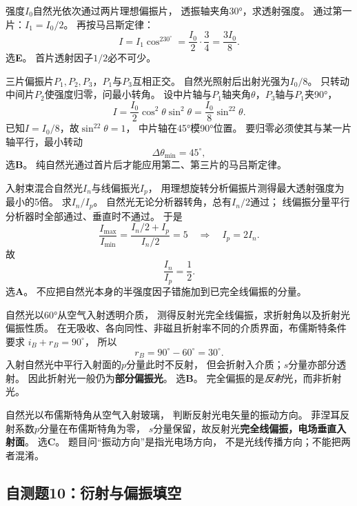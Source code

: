 \problemtext 强度$I_0$自然光依次通过两片理想偏振片，
透振轴夹角30°，求透射强度。
\workings
通过第一片：$I_1=I_0/2$。
再按马吕斯定律：
\[
\boxed{I=I_1\cos^230^\circ
=\frac{I_0}{2}\cdot\frac34=\frac{3I_0}{8}}.
\]
选\textbf{E}。
\crosscheck 首片透射因子$1/2$必不可少。

\problemtext 三片偏振片$P_1,P_2,P_3$，$P_1$与$P_3$互相正交。
自然光照射后出射光强为$I_0/8$。
只转动中间片$P_2$使强度归零，问最小转角。
\workings
设中片轴与$P_1$轴夹角$\theta$，$P_3$轴与$P_1$夹90°，
\[
 I=\frac{I_0}{2}\cos^2\theta\sin^2\theta
 =\frac{I_0}{8}\sin^22\theta.
\]
已知$I=I_0/8$，故$\sin^22\theta=1$，
中片轴在45°模90°位置。
要归零必须使其与某一片轴平行，最小转动
\[
\boxed{\Delta\theta_{\min}=45^\circ},
\]
选\textbf{B}。
\crosscheck 纯自然光通过首片后才能应用第二、第三片的马吕斯定律。

\problemtext 入射束混合自然光$I_n$与线偏振光$I_p$，
用理想旋转分析偏振片测得最大透射强度为最小的5倍。
求$I_n/I_p$。
\workings
自然光无论分析器转角，总有$I_n/2$通过；
线偏振分量平行分析器时全部通过、垂直时不通过。
于是
\[
\frac{I_{\max}}{I_{\min}}
=\frac{I_n/2+I_p}{I_n/2}=5
\quad\Longrightarrow\quad I_p=2I_n.
\]
故
\[
\boxed{\frac{I_n}{I_p}=\frac12}.
\]
选\textbf{A}。
\crosscheck 不应把自然光本身的半强度因子错施加到已完全线偏振的分量。

\problemtext 自然光以60°从空气入射透明介质，
测得反射光完全线偏振，求折射角以及折射光偏振性质。
\workings
在无吸收、各向同性、非磁且折射率不同的介质界面，布儒斯特条件要求
$i_B+r_B=90^\circ$，
所以
\[
\boxed{r_B=90^\circ-60^\circ=30^\circ}.
\]
入射自然光中平行入射面的$p$分量此时不反射，
但会折射入介质；$s$分量亦部分透射。
因此折射光一般仍为\textbf{部分偏振光}。
选\textbf{B}。
\crosscheck 完全偏振的是\emph{反射}光，而非折射光。

\problemtext 自然光以布儒斯特角从空气入射玻璃，
判断反射光电矢量的振动方向。
\workings
菲涅耳反射系数$p$分量在布儒斯特角为零，
$s$分量保留，故反射光\textbf{完全线偏振，电场垂直入射面}。
选\textbf{C}。
\crosscheck 题目问“振动方向”是指光电场方向，
不是光线传播方向；不能把两者混淆。

\subsection{自测题10：衍射与偏振填空}

